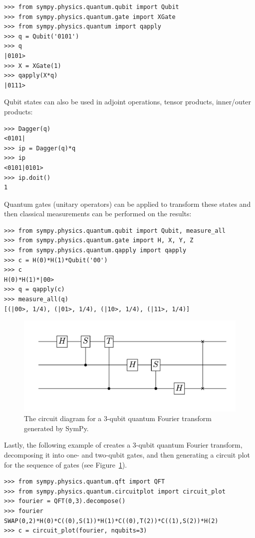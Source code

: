 \begin{verbatim}
>>> from sympy.physics.quantum.qubit import Qubit
>>> from sympy.physics.quantum.gate import XGate
>>> from sympy.physics.quantum import qapply
>>> q = Qubit('0101')
>>> q
|0101>
>>> X = XGate(1)
>>> qapply(X*q)
|0111>
\end{verbatim}
Qubit states can also be used in adjoint operations, tensor products, inner/outer
products:
\begin{verbatim}
>>> Dagger(q)
<0101|
>>> ip = Dagger(q)*q
>>> ip
<0101|0101>
>>> ip.doit()
1
\end{verbatim}
Quantum gates (unitary operators) can be applied to transform these states and
then classical measurements can be performed on the results:
\begin{verbatim}
>>> from sympy.physics.quantum.qubit import Qubit, measure_all
>>> from sympy.physics.quantum.gate import H, X, Y, Z
>>> from sympy.physics.quantum.qapply import qapply
>>> c = H(0)*H(1)*Qubit('00')
>>> c
H(0)*H(1)*|00>
>>> q = qapply(c)
>>> measure_all(q)
[(|00>, 1/4), (|01>, 1/4), (|10>, 1/4), (|11>, 1/4)]
\end{verbatim}
\begin{figure}[htbp]
\begin{center}
\includegraphics[scale=0.65]{images/circuitplot-qft}
\caption{The circuit diagram for a 3-qubit quantum Fourier transform
generated by SymPy.}
\label{fig-circuitplot-qft}
\end{center}
\end{figure}
Lastly, the following example of creates a 3-qubit quantum Fourier transform,
decomposing it into one- and two-qubit gates, and then generating a circuit plot
for the sequence of gates (see Figure~\ref{fig-circuitplot-qft}).
\begin{verbatim}
>>> from sympy.physics.quantum.qft import QFT
>>> from sympy.physics.quantum.circuitplot import circuit_plot
>>> fourier = QFT(0,3).decompose()
>>> fourier
SWAP(0,2)*H(0)*C((0),S(1))*H(1)*C((0),T(2))*C((1),S(2))*H(2)
>>> c = circuit_plot(fourier, nqubits=3)
\end{verbatim}
